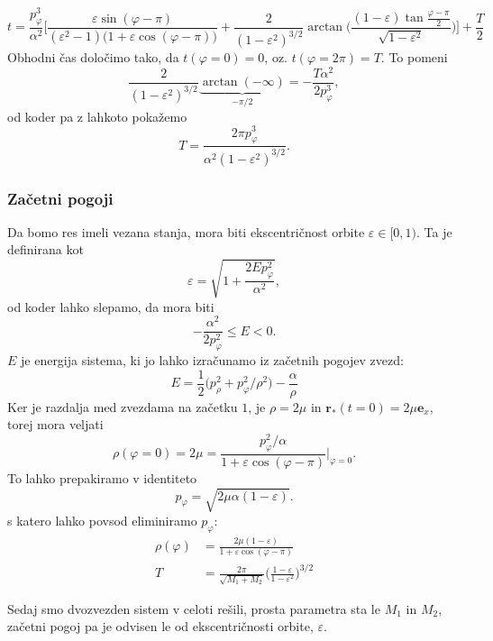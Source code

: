 \documentclass[12pt, a4paper]{article}
\renewcommand{\r}{
    \ensuremath{\mathbf{r}}
}
\newcommand{\ee}{
    \ensuremath{\mathbf{e}}
}
\begin{document}
\begin{equation}
    t = \frac{p_\varphi^3}{\alpha^2}\bigg[\frac{\varepsilon\sin(\varphi-\pi)}{(\varepsilon^2 - 1)\big(1 +
        \varepsilon\cos(\varphi - \pi)\big)} +\frac{2}{(1 - \varepsilon^2)^{3/2}}\arctan\bigg(\frac{(1 - \varepsilon)
    \tan\frac{\varphi-\pi}{2}}{\sqrt{1 - \varepsilon^2}}\bigg)\bigg]+\frac{T}{2}
    \label{casovna}
\end{equation}
Obhodni \v cas dolo\v cimo tako, da $t(\varphi = 0) = 0$, oz. $t(\varphi = 2\pi) = T$. To pomeni
\[
    \frac{2}{(1 - \varepsilon^2)^{3/2}}\underbrace{\arctan(-\infty)}_{-\pi/2} = -\frac{T\alpha^2}{2p^3_\varphi},
\]
od koder pa z lahkoto poka\v zemo
\begin{equation}
    T = \frac{2\pi p^3_\varphi}{\alpha^2(1 - \varepsilon^2)^{3/2}}.
    \label{leto}
\end{equation}
\subsubsection{Za\v cetni pogoji}
Da bomo res imeli vezana stanja, mora biti ekscentri\v cnost orbite $\varepsilon \in [0, 1)$. Ta je definirana kot
\[
    \varepsilon = \sqrt{1 + \frac{2Ep_\varphi^2}{\alpha^2}},
\]
od koder lahko slepamo, da mora biti
\[
    -\frac{\alpha^2}{2p^2_\varphi} \leq E < 0.
\]
$E$ je energija sistema, ki jo lahko izra\v cunamo iz za\v cetnih pogojev zvezd:
\begin{equation}
    E = \frac{1}{2}\big(p_\rho^2 + p_\varphi^2/\rho^2\big) - \frac{\alpha}{\rho}
\end{equation}
Ker je razdalja med zvezdama na za\v cetku $1$, je $\rho = 2\mu$ in $\r_*(t = 0) = 2\mu\ee_x$,
torej mora veljati
\begin{equation}
    \rho(\varphi = 0) = 2\mu = \frac{p_\varphi^2/\alpha}{1 + \varepsilon\cos(\varphi-\pi)}\bigg|_{\varphi = 0}.
\end{equation}
To lahko prepakiramo v identiteto
\begin{equation}
    p_\varphi = \sqrt{2\mu\alpha(1 - \varepsilon)}.
\end{equation}
s katero lahko povsod eliminiramo $p_\varphi$:
\begin{align}
    \rho(\varphi) &= \frac{2\mu(1 - \varepsilon)}{1 + \varepsilon\cos(\varphi - \pi)} \\
    T &= \frac{2\pi}{\sqrt{M_1 + M_2}}\bigg(\frac{1 - \varepsilon}{1 - \varepsilon^2}\bigg)^{3/2}
	\label{obhodni}
\end{align}

Sedaj smo dvozvezden sistem v celoti re\v sili, prosta parametra sta le $M_1$ in $M_2$, za\v cetni pogoj pa je odvisen
le od ekscentri\v cnosti orbite, $\varepsilon$.
\end{document}
